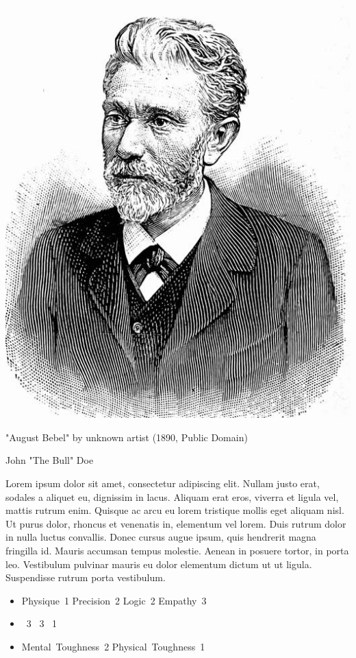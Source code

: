 \documentclass[english]{vaesen-supplement}
\begin{document}
\begin{center}
    \includegraphics[width=0.8\linewidth]{img/Bebel.jpg}
    
    {\footnotesize "August Bebel" by unknown artist (1890, Public Domain)}
\end{center}

\begin{panel}[NPC]{John "The Bull" Doe}

    Lorem ipsum dolor sit amet, consectetur adipiscing elit. Nullam justo erat, sodales a aliquet eu, dignissim in lacus. Aliquam erat eros, viverra et ligula vel, mattis rutrum enim. Quisque ac arcu eu lorem tristique mollis eget aliquam nisl. Ut purus dolor, rhoncus et venenatis in, elementum vel lorem. Duis rutrum dolor in nulla luctus convallis. Donec cursus augue ipsum, quis hendrerit magna fringilla id. Mauris accumsan tempus molestie. Aenean in posuere tortor, in porta leo. Vestibulum pulvinar mauris eu dolor elementum dictum ut ut ligula. Suspendisse rutrum porta vestibulum. 

\begin{itemize}\sffamily\small
    \item Physique~1 \quad Precision~2 \quad Logic~2 \quad Empathy~3
    \item {}~3 \quad {}~3 \quad {}~1
    \item Mental~Toughness~2 \quad Physical~Toughness~1
\end{itemize}
\end{panel}
\end{document}
